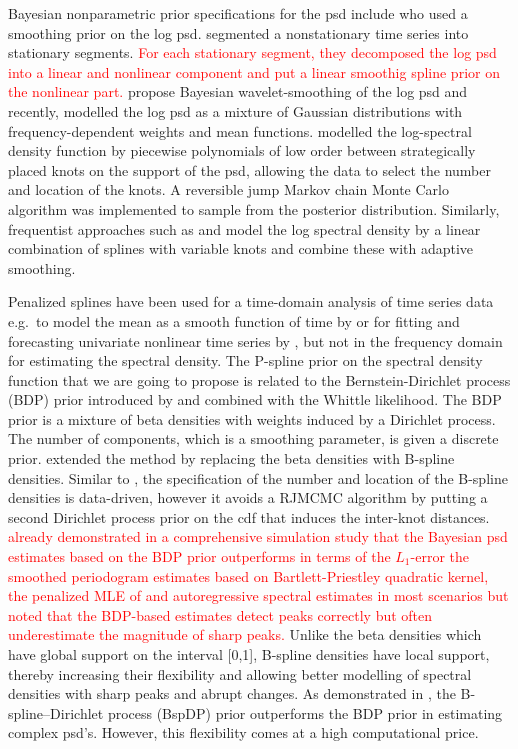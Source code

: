 \documentclass[twocolumn,final]{svjour3}
\begin{document}
Bayesian nonparametric prior specifications for the psd include \cite{Cart:1997}
who used a smoothing prior on the log psd.  \cite{Rosen:2012} segmented a nonstationary time series into stationary segments. \textcolor{red}{For each stationary segment, they decomposed the log psd into a linear and nonlinear component and  put a linear smoothig spline prior on the nonlinear part. }\cite{Pensky:2007} propose Bayesian wavelet-smoothing of the log psd and recently, \cite{Cadonna2017} modelled the log psd  as a mixture of Gaussian distributions with frequency-dependent weights and mean functions.
%
\cite{Gangopadhyay:1999} modelled the log-spectral density function by  piecewise polynomials of low order between strategically placed knots on the support of the psd,  allowing the data to select the number and location of the knots.  A reversible jump Markov chain Monte Carlo \citep[RJMCMC;][]{Green:1995} algorithm was implemented to sample from the posterior distribution.  Similarly, frequentist approaches such as \cite{Rodriguez} and \cite{Wood2017} model the log spectral density by a linear combination of splines with variable knots and combine these with adaptive smoothing. 

Penalized splines have been used for a time-domain analysis of time series data e.g.\ to model the mean as a smooth function of time by \cite{Krivobokova}  or for fitting and  forecasting univariate  nonlinear time series by \cite{Wegener}, but not in the frequency domain for estimating the spectral density.
The P-spline prior on the spectral density function that we are going to propose is related to the 
Bernstein-Dirichlet process (BDP) prior  introduced by \cite{Choudhuri:2004} and combined with the Whittle likelihood.  The BDP prior  is a mixture of beta densities with weights induced by a Dirichlet process.  The number of components, which is a smoothing parameter, is given a discrete prior.  \cite{Edwards2019} extended the method by replacing the beta densities with B-spline densities. Similar to 
\cite{Gangopadhyay:1999}, the specification of the number and location of the B-spline densities is data-driven, however it avoids a RJMCMC algorithm by putting a second Dirichlet process prior  on the cdf that induces the inter-knot distances. \textcolor{red}{ \cite{Choudhuri:2004} already demonstrated in a comprehensive simulation study  that the Bayesian psd estimates based on the BDP prior outperforms in terms of the $L_1$-error the smoothed periodogram estimates based on Bartlett-Priestley quadratic kernel, the penalized MLE of \cite{Pawitan} and autoregressive spectral estimates in most scenarios but noted that the BDP-based estimates detect peaks correctly but often underestimate the magnitude of sharp peaks.}
Unlike the beta densities  which have global support on the interval [0,1], B-spline densities have local support, thereby increasing their flexibility and allowing better modelling of spectral densities with sharp peaks and abrupt changes.  As demonstrated in \cite{Edwards2019}, the B-spline--Dirichlet process (BspDP) prior outperforms the BDP prior in estimating complex psd's.  However, this flexibility comes at a high computational price.
\end{document}
